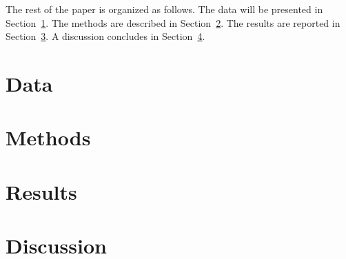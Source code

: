 \documentclass[12pt]{article}
\begin{document}
The rest of the paper is organized as follows.
The data will be presented in Section~\ref{sec:data}.
The methods are described in Section~\ref{sec:meth}.
The results are reported in Section~\ref{sec:resu}.
A discussion concludes in Section~\ref{sec:disc}.


\section{Data}
\label{sec:data}





\section{Methods}
\label{sec:meth}







\section{Results}
\label{sec:resu}


\section{Discussion}
\label{sec:disc}












 
\end{document}
